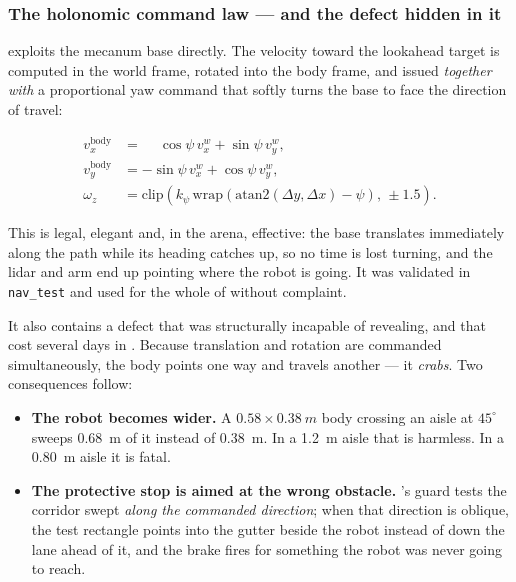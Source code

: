 \subsubsection{The holonomic command law --- and the defect hidden in it}

\phaseA{} exploits the mecanum base directly. The velocity toward the
lookahead target is computed in the world frame, rotated into the body
frame, and issued \emph{together with} a proportional yaw command that
softly turns the base to face the direction of travel:

\begin{align}
v_x^{\text{body}} &= \phantom{-}\cos\psi\, v_x^{w} + \sin\psi\, v_y^{w},\\
v_y^{\text{body}} &= -\sin\psi\, v_x^{w} + \cos\psi\, v_y^{w},\\
\omega_z &= \mathrm{clip}\!\left(k_\psi\,
   \mathrm{wrap}(\mathrm{atan2}(\Delta y, \Delta x) - \psi),\,
   \pm 1.5\right).
\label{eq:crab}
\end{align}

This is legal, elegant and, in the \phaseA{} arena, effective: the base
translates immediately along the path while its heading catches up, so
no time is lost turning, and the lidar and arm end up pointing where the
robot is going. It was validated in \texttt{nav\_test} and used for the
whole of \phaseA{} without complaint.

It also contains a defect that \phaseA{} was structurally incapable of
revealing, and that cost several days in \phaseB{}. Because translation
and rotation are commanded simultaneously, the body points one way and
travels another --- it \emph{crabs}. Two consequences follow:

\begin{itemize}[leftmargin=*,itemsep=1pt,topsep=2pt]
  \item \textbf{The robot becomes wider.} A $0.58 \times \SI{0.38}{m}$
        body crossing an aisle at $45^\circ$ sweeps \SI{0.68}{m} of it
        instead of \SI{0.38}{m}. In a \SI{1.2}{m} \phaseA{} aisle that
        is harmless. In a \SI{0.80}{m} \phaseB{} aisle it is fatal.
  \item \textbf{The protective stop is aimed at the wrong obstacle.}
        \phaseB{}'s guard tests the corridor swept \emph{along the
        commanded direction}; when that direction is oblique, the test
        rectangle points into the gutter beside the robot instead of
        down the lane ahead of it, and the brake fires for something the
        robot was never going to reach.
\end{itemize}

